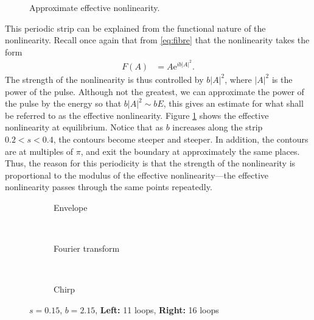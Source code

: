 %
\begin{figure}[tbp]
\centering

\caption{Approximate effective nonlinearity.}
\label{fig:effnl}
\end{figure}
This periodic strip can be explained from the functional nature of the nonlinearity. Recall once again that from \eqref{eq:fibre} that the nonlinearity takes the form
\begin{align*}
F(A) &= A \textrm{e}^{i b |A|^2}.
\end{align*}
The strength of the nonlinearity is thus controlled by $b |A|^2$, where $|A|^2$ is the power of the pulse. Although not the greatest, we can approximate the power of the pulse by the energy so that $b |A|^2 \sim b E$, this gives an estimate for what shall be referred to as the effective nonlinearity. Figure \ref{fig:effnl} shows the effective nonlinearity at equilibrium. Notice that as $b$ increases along the strip $0.2 < s < 0.4$, the contours become steeper and steeper. In addition, the contours are at multiples of $\pi$, and exit the boundary at approximately the same places. Thus, the reason for this periodicity is that the strength of the nonlinearity is proportional to the modulus of the effective nonlinearity---the effective nonlinearity passes through the same points repeatedly. \\

\begin{figure}[p]
\centering
\begin{subfigure}{\textwidth}
\centering
%

\caption{Envelope}
\end{subfigure} \\
\begin{subfigure}{\textwidth}
\centering
%

\caption{Fourier transform}
\end{subfigure} \\
\begin{subfigure}{\textwidth}
\centering
%

\caption{Chirp}
\end{subfigure}
\caption[Envelope, Fourier transform, and chirp of the pulse---unstable case.]{$s = 0.15$, $b = 2.15$, \textbf{Left:} 11 loops, \textbf{Right:} 16 loops}
\label{fig:break}
\end{figure}

